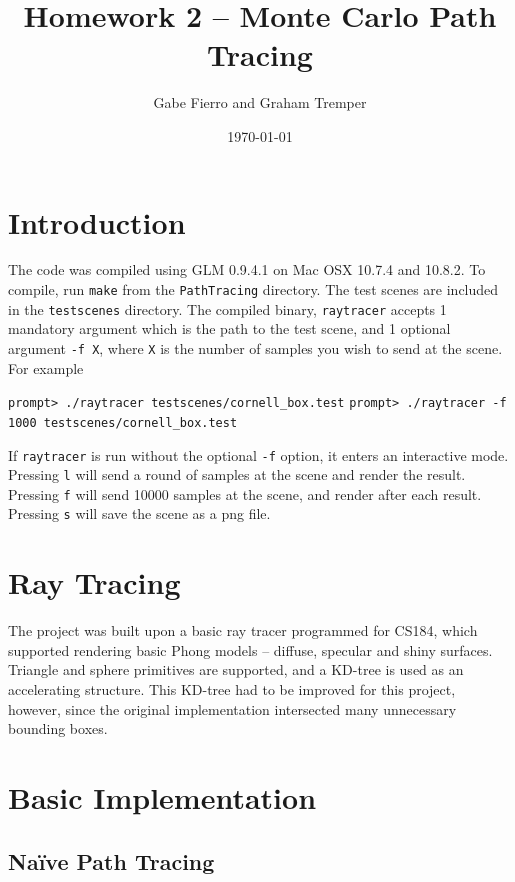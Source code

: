 \documentclass[11pt]{article}
\begin{document}
\title{Homework 2 -- Monte Carlo Path Tracing}
\author{Gabe Fierro and Graham Tremper}
\date{\today}
\maketitle

\section{Introduction}

The code was compiled using GLM 0.9.4.1 on Mac OSX 10.7.4 and 10.8.2. To compile, run \verb`make` from
the \verb`PathTracing` directory. The test scenes are included in the \verb`testscenes` directory. The
compiled binary, \verb`raytracer` accepts 1 mandatory argument which is the path to the test scene, and
1 optional argument \verb`-f X`, where \verb`X` is the number of samples you wish to send at the scene.
For example

\begin{center}
	\verb`prompt> ./raytracer testscenes/cornell_box.test`
	\verb`prompt> ./raytracer -f 1000 testscenes/cornell_box.test`
\end{center}

If \verb`raytracer` is run without the optional \verb`-f` option, it enters an interactive mode. Pressing \verb`l`
will send a round of samples at the scene and render the result. Pressing \verb`f` will send 10000 samples
at the scene, and render after each result. Pressing \verb`s` will save the scene as a png file.

\section{Ray Tracing}

The project was built upon a basic ray tracer programmed for CS184, which supported rendering basic Phong models -- diffuse, specular and shiny surfaces. Triangle and sphere primitives are supported, and a KD-tree is used as an accelerating structure. This KD-tree had to be improved for this project, however, since the original implementation intersected many unnecessary bounding boxes. 

\section{Basic Implementation}

\subsection{Naïve Path Tracing}
\end{document}
